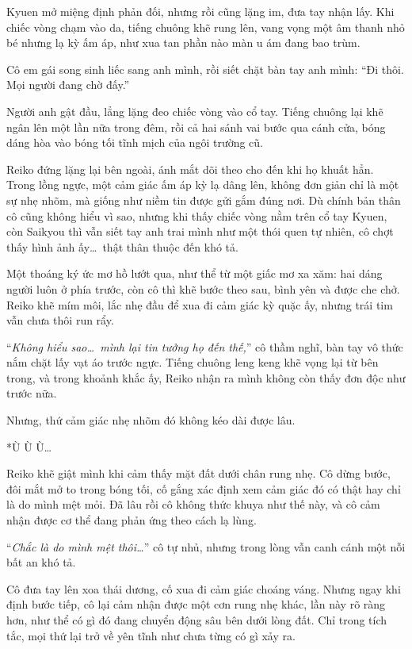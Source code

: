 \documentclass[../main.tex]{subfiles}
\begin{document}
Kyuen mở miệng định phản đối, nhưng rồi cũng lặng im, đưa tay nhận lấy. Khi chiếc vòng chạm vào da, tiếng chuông khẽ rung lên, vang vọng một âm thanh nhỏ bé nhưng lạ kỳ ấm áp, như xua tan phần nào màn u ám đang bao trùm.

Cô em gái song sinh liếc sang anh mình, rồi siết chặt bàn tay anh mình: ``Đi thôi. Mọi người đang chờ đấy.''

Người anh gật đầu, lẳng lặng đeo chiếc vòng vào cổ tay. Tiếng chuông lại khẽ ngân lên một lần nữa trong đêm, rồi cả hai sánh vai bước qua cánh cửa, bóng dáng hòa vào bóng tối tĩnh mịch của ngôi trường cũ.

Reiko đứng lặng lại bên ngoài, ánh mắt dõi theo cho đến khi họ khuất hẳn. Trong lồng ngực, một cảm giác ấm áp kỳ lạ dâng lên, không đơn giản chỉ là một sự nhẹ nhõm, mà giống như niềm tin được gửi gắm đúng nơi. Dù chính bản thân cô cũng không hiểu vì sao, nhưng khi thấy chiếc vòng nằm trên cổ tay Kyuen, còn Saikyou thì vẫn siết tay anh trai mình như một thói quen tự nhiên, cô chợt thấy hình ảnh ấy\dots\ thật thân thuộc đến khó tả.

Một thoáng ký ức mơ hồ lướt qua, như thể từ một giấc mơ xa xăm: hai dáng người luôn ở phía trước, còn cô thì khẽ bước theo sau, bình yên và được che chở. Reiko khẽ mím môi, lắc nhẹ đầu để xua đi cảm giác kỳ quặc ấy, nhưng trái tim vẫn chưa thôi run rẩy.

``\textit{Không hiểu sao\dots\ mình lại tin tưởng họ đến thế,}'' cô thầm nghĩ, bàn tay vô thức nắm chặt lấy vạt áo trước ngực. Tiếng chuông leng keng khẽ vọng lại từ bên trong, và trong khoảnh khắc ấy, Reiko nhận ra mình không còn thấy đơn độc như trước nữa.

Nhưng, thứ cảm giác nhẹ nhõm đó không kéo dài được lâu.

*Ù Ù Ù\dots*

Reiko khẽ giật mình khi cảm thấy mặt đất dưới chân rung nhẹ. Cô dừng bước, đôi mắt mở to trong bóng tối, cố gắng xác định xem cảm giác đó có thật hay chỉ là do mình mệt mỏi. Đã lâu rồi cô không thức khuya như thế này, và cô cảm nhận được cơ thể đang phản ứng theo cách lạ lùng.

``\textit{Chắc là do mình mệt thôi\dots}'' cô tự nhủ, nhưng trong lòng vẫn canh cánh một nỗi bất an khó tả.

Cô đưa tay lên xoa thái dương, cố xua đi cảm giác choáng váng. Nhưng ngay khi định bước tiếp, cô lại cảm nhận được một cơn rung nhẹ khác, lần này rõ ràng hơn, như thể có gì đó đang chuyển động sâu bên dưới lòng đất. Chỉ trong tích tắc, mọi thứ lại trở về yên tĩnh như chưa từng có gì xảy ra.
\end{document}
